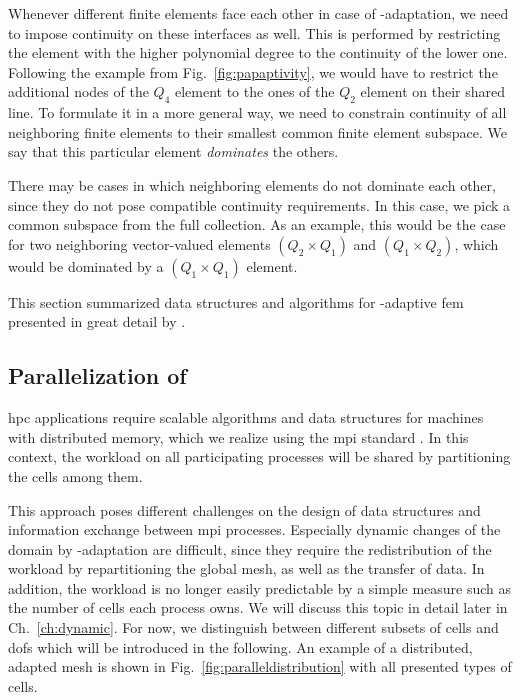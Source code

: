 Whenever different finite elements face each other in case of \p-adaptation, we need to impose continuity on these interfaces as well. This is performed by restricting the element with the higher polynomial degree to the continuity of the lower one. Following the example from Fig.~\ref{fig:papaptivity}, we would have to restrict the additional nodes of the $Q_4$ element to the ones of the $Q_2$ element on their shared line. To formulate it in a more general way, we need to constrain continuity of all neighboring finite elements to their smallest common finite element subspace. We say that this particular element \textit{dominates} the others.

There may be cases in which neighboring elements do not dominate each other, since they do not pose compatible continuity requirements. In this case, we pick a common subspace from the full collection. As an example, this would be the case for two neighboring vector-valued elements $(Q_2 \times Q_1)$ and $(Q_1 \times Q_2)$, which would be dominated by a $(Q_1 \times Q_1)$ element.

This section summarized data structures and algorithms for \hp-adaptive \gls{fem} presented in great detail by \textcite{bangerth2009}.





\subsection{Parallelization of }

\Gls{hpc} applications require scalable algorithms and data structures for machines with distributed memory, which we realize using the \gls{mpi} standard \textcite{mpi31}. In this context, the workload on all participating processes will be shared by partitioning the cells among them.

This approach poses different challenges on the design of data structures and information exchange between \gls{mpi} processes. Especially dynamic changes of the domain by \hp-adaptation are difficult, since they require the redistribution of the workload by repartitioning the global mesh, as well as the transfer of data. In addition, the workload is no longer easily predictable by a simple measure such as the number of cells each process owns. We will discuss this topic in detail later in Ch.~\ref{ch:dynamic}. For now, we distinguish between different subsets of cells and \glspl{dof} which will be introduced in the following. An example of a distributed, adapted mesh is shown in Fig.~\ref{fig:paralleldistribution} with all presented types of cells.

